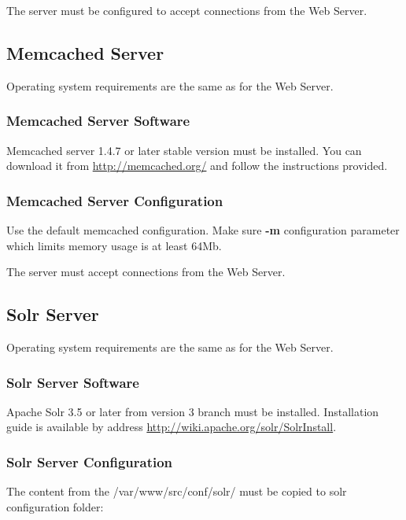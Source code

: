 \documentclass[12pt]{article}
\newcommand{\vigShowNotes}{1}
\newcommand{\vigPathToProject}{/var/www}
\newcommand{\vigPathToSrc}{/src}
\newcommand{\note}[1]{\ifthenelse{\vigShowNotes=1}{
\textbf{NOTE:} 
\textcolor{Brown}{
#1
}
}{}}
\newcommand{\todo}[1]{\ifthenelse{\vigShowNotes=1}{
\textbf{TODO:} 
\textcolor{Red}{
#1
}
}{}}
\begin{document}
The server must be configured to accept connections from the Web Server.

\subsection{Memcached Server}
Operating system requirements are the same as for the Web Server.

\subsubsection{Memcached Server Software}

Memcached server 1.4.7 or later stable version must be installed. You can download it from \url{http://memcached.org/} and follow the instructions provided.

\subsubsection{Memcached Server Configuration}

Use the default memcached configuration. Make sure \textbf{-m} configuration parameter which limits memory usage is at least 64Mb.

The server must accept connections from the Web Server.

\subsection{Solr Server}
Operating system requirements are the same as for the Web Server.

\subsubsection{Solr Server Software}

Apache Solr 3.5 or later from version 3 branch must be installed. Installation guide is available by address \url{http://wiki.apache.org/solr/SolrInstall}.

\note{Solr 3.5 required for Hunspell dictionary support.}

\todo{More solr installation notes}

\subsubsection{Solr Server Configuration}

The content from the \textsf{\vigPathToProject\vigPathToSrc/conf/solr/} must be copied to solr configuration folder:
\end{document}
